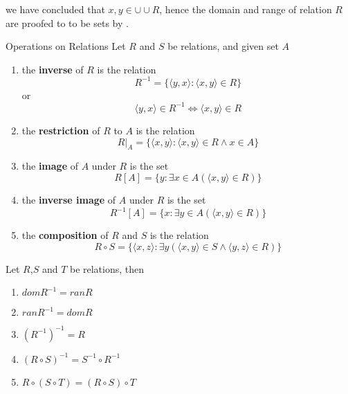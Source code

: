 \begin{remarks}
    we have concluded that $x, y \in \cup \cup R$, hence the domain and range of relation $R$ are proofed to to be sets by .
\end{remarks}

\begin{definition}{Operations on Relations}{}
    Let $R$ and $S$ be relations, and given set $A$
    \begin{enumerate}

        \item the \textbf{inverse} of $R$ is the relation
        \begin{equation*}
            R^{-1} = \{\langle y,x \rangle : \langle x,y \rangle \in R\}
        \end{equation*}
        or
        \begin{equation*}
            \langle y,x \rangle \in R^{-1} \iff \langle x,y \rangle \in R
        \end{equation*}
        \item the \textbf{restriction} of $R$ to $A$ is the relation
        \begin{equation*}
            R \vert_{A} = \{\langle x,y \rangle : \langle x,y \rangle \in R \land x \in A\}
        \end{equation*}
        \item the \textbf{image} of $A$ under $R$ is the set
        \begin{equation*}
            R[A] = \{y : \exists x \in A (\langle x,y \rangle \in R)\}
        \end{equation*}
        \item the \textbf{inverse image} of $A$ under $R$ is the set
        \begin{equation*}
            R^{-1}[A] = \{x : \exists y \in A(\langle x,y \rangle \in R)\}
        \end{equation*}
        \item the \textbf{composition} of $R$ and $S$ is the relation
        \begin{equation*}
            R \circ S = \{\langle x,z \rangle : \exists y (\langle x,y \rangle \in S \land \langle y,z \rangle \in R)\}
        \end{equation*}
    \end{enumerate}
\end{definition}

\begin{proposition}{}{}
    Let $R$,$S$ and $T$ be relations, then
    \begin{enumerate}

        \item $dom R^{-1} = ran R$
        \item $ran R^{-1} = dom R$
        \item $(R^{-1})^{-1} = R$ 
        \item $(R \circ S)^{-1} = S^{-1} \circ R^{-1}$
        \item $R \circ (S \circ T) = (R \circ S) \circ T$

    \end{enumerate}
\end{proposition}

